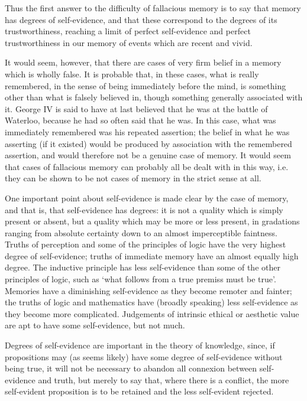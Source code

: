 \documentclass[oneside,letterpaper,12pt]{book}
\begin{document}
Thus the first answer to the difficulty of fallacious memory is to say
that memory has degrees of self-evidence, and that these correspond to
the degrees of its trustworthiness, reaching a limit of perfect
self-evidence and perfect trustworthiness in our memory of events which
are recent and vivid.

It would seem, however, that there are cases of very firm belief in a
memory which is wholly false. It is probable that, in these cases, what
is really remembered, in the sense of being immediately before the mind,
is something other than what is falsely believed in, though something
generally associated with it. George IV is said to have at last believed
that he was at the battle of Waterloo, because he had so often said that
he was. In this case, what was immediately remembered was his repeated
assertion; the belief in what he was asserting (if it existed) would be
produced by association with the remembered assertion, and would
therefore not be a genuine case of memory. It would seem that cases of
fallacious memory can probably all be dealt with in this way, i.e. they
can be shown to be not cases of memory in the strict sense at all.

\label{degrees} One important point about self-evidence is made clear by the case of
memory, and that is, that self-evidence has degrees: it is not a quality
which is simply present or absent, but a quality which may be more or
less present, in gradations ranging from absolute certainty down to an
almost imperceptible faintness. \label{hierarchy} Truths of perception and some of the
principles of logic have the very highest degree of self-evidence;
truths of immediate memory have an almost equally high degree. The
inductive principle has less self-evidence than some of the other
principles of logic, such as `what follows from a true
premiss must be true'. Memories have a diminishing
self-evidence as they become remoter and fainter; the truths of logic
and mathematics have (broadly speaking) less self-evidence as they
become more complicated. Judgements of intrinsic ethical or aesthetic
value are apt to have some self-evidence, but not much.

Degrees of self-evidence are important in the theory of knowledge,
since, if propositions may (as seems likely) have some degree of
self-evidence without being true, it will not be necessary to abandon
all connexion between self-evidence and truth, but merely to say that,
where there is a conflict, the more self-evident proposition is to be
retained and the less self-evident rejected.
\end{document}

